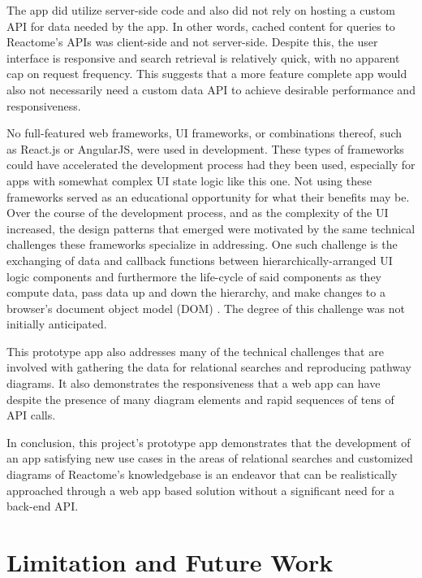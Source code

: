 \documentclass[12pt, letterpaper]{report}
\begin{document}
The app did utilize server-side code and also did not rely on hosting a custom API for data needed by the app. In other words, cached content for queries to Reactome's APIs was client-side and not server-side. Despite this, the user interface is responsive and search retrieval is relatively quick, with no apparent cap on request frequency. This suggests that a more feature complete app would also not necessarily need a custom data API to achieve desirable performance and responsiveness.

No full-featured web frameworks, UI frameworks, or combinations thereof, such as React.js or AngularJS, were used in development. These types of frameworks could have accelerated the development process had they been used, especially for apps with somewhat complex UI state logic like this one. Not using these frameworks served as an educational opportunity for what their benefits may be. Over the course of the development process, and as the complexity of the UI increased, the design patterns that emerged were motivated by the same technical challenges these frameworks specialize in addressing. One such challenge is the exchanging of data and callback functions between hierarchically-arranged UI logic components and furthermore the life-cycle of said components as they compute data, pass data up and down the hierarchy, and make changes to a browser's document object model (DOM) \cite{ReactJSMainConcepts}. The degree of this challenge was not initially anticipated.

This prototype app also addresses many of the technical challenges that are involved with gathering the data for relational searches and reproducing pathway diagrams. It also  demonstrates the responsiveness that a web app can have despite the presence of many diagram elements and rapid sequences of tens of API calls.

In conclusion, this project's prototype app demonstrates that the development of an app satisfying new use cases in the areas of relational searches and customized diagrams of Reactome's knowledgebase is an endeavor that can be realistically approached through a web app based solution without a significant need for a back-end API.

\chapter{Limitation and Future Work}
\end{document}
